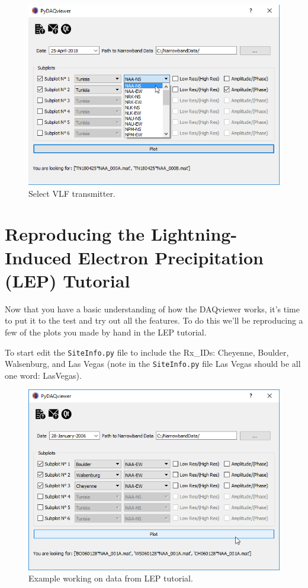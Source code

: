 \documentclass[%
oneside,                 %
final,                   %
10pt]{article}
\begin{document}
\begin{figure}[!ht]  %
  \centerline{\includegraphics[width=1.0\linewidth]{imgs/SelectTx.png}}
  \caption{
  Select VLF transmitter. \label{fig:SelectTx}
  }
\end{figure}



\section{Reproducing the Lightning-Induced Electron Precipitation (LEP) Tutorial}
Now that you have a basic understanding of how the DAQviewer works, it's time to put it to the test and try out all the features. To do this we'll be reproducing a few of the plots you made by hand in the LEP tutorial.

To start edit the \texttt{SiteInfo.py} file to include the Rx_IDs: Cheyenne, Boulder, Walsenburg, and Las Vegas (note in the \texttt{SiteInfo.py} file Las Vegas should be all one word: LasVegas).


\begin{figure}[!ht]  %
  \centerline{\includegraphics[width=1.0\linewidth]{imgs/LEPtuto.png}}
  \caption{
  Example working on data from LEP tutorial. \label{fig:LEP_Tuto}
  }
\end{figure}
\end{document}
